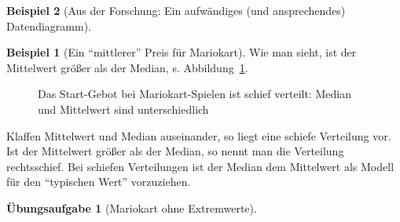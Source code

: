 \documentclass[
  a4paper,
]{scrbook}
\theoremstyle{definition}
\newtheorem{example}{Beispiel}[chapter]
\theoremstyle{definition}
\theoremstyle{definition}
\newtheorem{exercise}{Übungsaufgabe}[chapter]
\theoremstyle{remark}
\begin{document}
\begin{example}[Aus der Forschung: Ein aufwändiges (und ansprechendes)
Datendiagramm]
\begin{example}[Ein ``mittlerer'' Preis für
Mariokart]
Wie man sieht, ist der Mittelwert größer als der Median, s.
Abbildung~\ref{fig-mario-md}.

\begin{figure}


\caption{\label{fig-mario-md}Das Start-Gebot bei Mariokart-Spielen ist
schief verteilt: Median und Mittelwert sind unterschiedlich}

\end{figure}%

\end{example}

\begin{tcolorbox}[enhanced jigsaw, colbacktitle=quarto-callout-note-color!10!white, bottomrule=.15mm, left=2mm, breakable, rightrule=.15mm, coltitle=black, title=\textcolor{quarto-callout-note-color}{\faInfo}\hspace{0.5em}{Hinweis}, colback=white, leftrule=.75mm, titlerule=0mm, opacityback=0, bottomtitle=1mm, toprule=.15mm, arc=.35mm, toptitle=1mm, opacitybacktitle=0.6, colframe=quarto-callout-note-color-frame]

Klaffen Mittelwert und Median auseinander, so liegt eine schiefe
Verteilung vor. Ist der Mittelwert größer als der Median, so nennt man
die Verteilung rechtsschief. Bei schiefen Verteilungen ist der Median
dem Mittelwert als Modell für den ``typischen Wert'' vorzuziehen.

\end{tcolorbox}

\begin{exercise}[Mariokart ohne
Extremwerte]\protect\hypertarget{exr-mw-no-extrem}{}\label{exr-mw-no-extrem}


\end{exercise}
\end{example}
\end{document}
